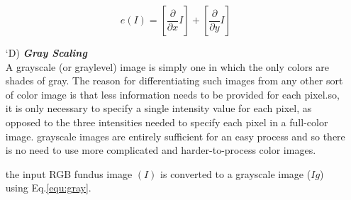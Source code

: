 \begin{itemize}[labelindent=1em,labelsep=0.25cm,leftmargin=*]
        \begin{equation}
            e(I) = [\frac{\partial}{\partial x} I] + [\frac{\partial}{\partial y} I]
            \label{equ:blur}
        \end{equation}
        \item[\char `D)] \textit{\textbf{Gray Scaling}}\\
        A grayscale (or graylevel) image is simply one in which the only colors are shades of gray. The reason for differentiating such images from any other sort of color image is that less information needs to be provided for each pixel.so, it is only necessary to specify a single intensity value for each pixel, as opposed to the three intensities needed to specify each pixel in a full-color image.
        grayscale images are entirely sufficient for an easy process and so there is no need to use more complicated and harder-to-process color images.
        
        the input RGB fundus image $(I)$ is converted to a grayscale image ($Ig$) using Eq.\ref{equ:gray}.
        

\end{itemize}
